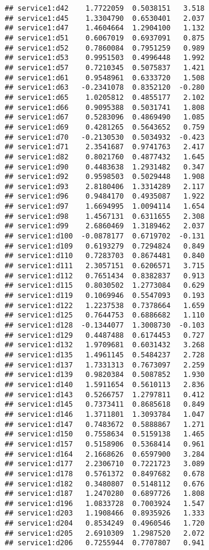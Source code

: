 \documentclass[
]{article}
\begin{document}
\begin{verbatim}
## service1:d42    1.7722059  0.5038151   3.518
## service1:d45    1.3304790  0.6530401   2.037
## service1:d47    1.4604664  1.2904100   1.132
## service1:d51    0.6067019  0.6937091   0.875
## service1:d52    0.7860084  0.7951259   0.989
## service1:d53    0.9951503  0.4996448   1.992
## service1:d57    0.7210345  0.5075837   1.421
## service1:d61    0.9548961  0.6333720   1.508
## service1:d63   -0.2341078  0.8352120  -0.280
## service1:d65    1.0205812  0.4855177   2.102
## service1:d66    0.9095388  0.5031741   1.808
## service1:d67    0.5283096  0.4869490   1.085
## service1:d69    0.4281265  0.5643652   0.759
## service1:d70   -0.2130530  0.5034932  -0.423
## service1:d71    2.3541687  0.9741763   2.417
## service1:d82    0.8021760  0.4877432   1.645
## service1:d90    0.4483638  1.2931482   0.347
## service1:d92    0.9598503  0.5029448   1.908
## service1:d93    2.8180406  1.3314289   2.117
## service1:d96    0.9484170  0.4935087   1.922
## service1:d97    1.6694995  1.0094114   1.654
## service1:d98    1.4567131  0.6311655   2.308
## service1:d99    2.6860469  1.3189462   2.037
## service1:d100  -0.0878177  0.6719702  -0.131
## service1:d109   0.6193279  0.7294824   0.849
## service1:d110   0.7283703  0.8674481   0.840
## service1:d111   2.3057151  0.6206571   3.715
## service1:d112   0.7651434  0.8382837   0.913
## service1:d115   0.8030502  1.2773084   0.629
## service1:d119   0.1069946  0.5547093   0.193
## service1:d122   1.2237538  0.7378664   1.659
## service1:d125   0.7644753  0.6886682   1.110
## service1:d128  -0.1344077  1.3008730  -0.103
## service1:d129   0.4487488  0.6174453   0.727
## service1:d132   1.9709681  0.6031432   3.268
## service1:d135   1.4961145  0.5484237   2.728
## service1:d137   1.7331313  0.7673097   2.259
## service1:d139   0.9820384  0.5087852   1.930
## service1:d140   1.5911654  0.5610113   2.836
## service1:d143   0.5266757  1.2797811   0.412
## service1:d145   0.7373411  0.8685618   0.849
## service1:d146   1.3711801  1.3093784   1.047
## service1:d147   0.7483672  0.5888867   1.271
## service1:d150   0.7558634  0.5159138   1.465
## service1:d157   0.5158906  0.5368414   0.961
## service1:d164   2.1668626  0.6597900   3.284
## service1:d177   2.2306710  0.7221723   3.089
## service1:d178   0.5761372  0.8497682   0.678
## service1:d182   0.3480807  0.5148112   0.676
## service1:d187   1.2470280  0.6897726   1.808
## service1:d196   1.0833728  0.7003924   1.547
## service1:d203   1.1908466  0.8935926   1.333
## service1:d204   0.8534249  0.4960546   1.720
## service1:d205   2.6910309  1.2987520   2.072
## service1:d206   0.7255944  0.7707807   0.941

\end{verbatim}
\end{document}
